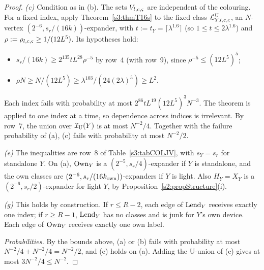 \begin{proof}
\emph{(c)} Condition as in (b). The sets $V_{l,c,\varsigma}$ are independent
of the colouring. For a fixed index, apply Theorem~\ref{s3:thmT16s} to
the fixed class $\mathcal{L}^{\mathrm{U}}_{Y,l,c,\varsigma}$, an $N$-vertex
$(2^{-6},s_r/(16k))$-expander, with $t:=t_Y=\lceil\lambda^{1.6}\rceil$
(so $1\le t\le2\lambda^{1.6}$) and
$\rho:=\rho_{l,c,\varsigma}\ge1/(12L^5)$. Its hypotheses hold:
\begin{itemize}
\item $s_r/(16k)\ge2^{135}tL^{28}\rho^{-5}$ by row~4 (with row~9), since
  $\rho^{-5}\le(12L^5)^5$;
\item $\rho N\ge N/(12L^5)\ge\lambda^{103}/(24(2\lambda)^5)\ge L^2$.
\end{itemize}
Each index fails with probability at most
$2^{86}tL^{19}(12L^5)^3N^{-3}$. The theorem is applied to one index at
a time, so dependence across indices is irrelevant. By row~7, the union
over $\mathcal{I}_{\mathrm{U}}(Y)$ is at most $N^{-2}/4$. Together with the failure
probability of (a), (c) fails with probability at most $N^{-2}/2$.

\emph{(e)} The inequalities are row~8 of Table~\ref{s3:tabCOLJV}, with
$s_Y=s_r$ for standalone $Y$. On (a), $\mathrm{Own}_Y$ is a
$(2^{-5},s_r/4)$-expander if $Y$ is standalone, and the own classes are
$(2^{-6},s_r/(16k_{\mathrm{own}}))$-expanders if $Y$ is light. Also $H_Y=X_Y$ is a
$(2^{-6},s_r/2)$-expander for light $Y$, by
Proposition~\ref{s2:propStructure}(i).

\emph{(g)} This holds by construction. If $r\le R-2$, each edge of
$\mathrm{Lend}_Y$ receives exactly one index; if $r\ge R-1$, $\mathrm{Lend}_Y$ has no
classes and is junk for $Y$'s own device. Each edge of $\mathrm{Own}_Y$ receives
exactly one own label.

\emph{Probabilities.} By the bounds above, (a) or (b) fails with
probability at most $N^{-2}/4+N^{-2}/4=N^{-2}/2$, and (e) holds on (a).
Adding the U-union of (c) gives at most $3N^{-2}/4\le N^{-2}$.
\end{proof}
